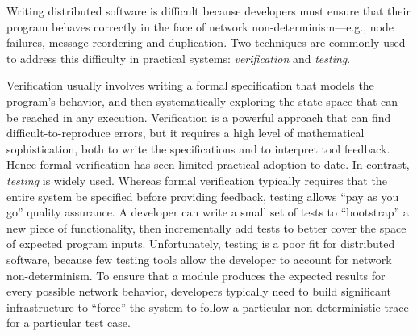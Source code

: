 

Writing distributed software is difficult because developers must ensure that
their program behaves correctly in the face of network non-determinism---e.g.,
node failures, message reordering and duplication. Two techniques are commonly
used to address this difficulty in practical systems: \emph{verification} and
\emph{testing}.

Verification usually involves writing a formal specification that models the program's
behavior, and then systematically exploring the state space that can be reached
in any execution. Verification is a powerful approach that can find
difficult-to-reproduce errors, but it requires a high level of mathematical
sophistication, both to write the specifications and to interpret tool feedback.
Hence formal verification has seen limited practical adoption to date. In
contrast, \emph{testing} is widely used. Whereas formal verification typically
requires that the entire system be specified before providing feedback, testing
allows ``pay as you go'' quality assurance. A developer can write a small set of
tests to ``bootstrap'' a new piece of functionality, then incrementally add
tests to better cover the space of expected program inputs. Unfortunately,
testing is a poor fit for distributed software, because few testing tools allow
the developer to account for network non-determinism. To ensure that a module
produces the expected results for every possible network behavior, developers
typically need to build significant infrastructure to ``force'' the system to
follow a particular non-deterministic trace for a particular test case.


